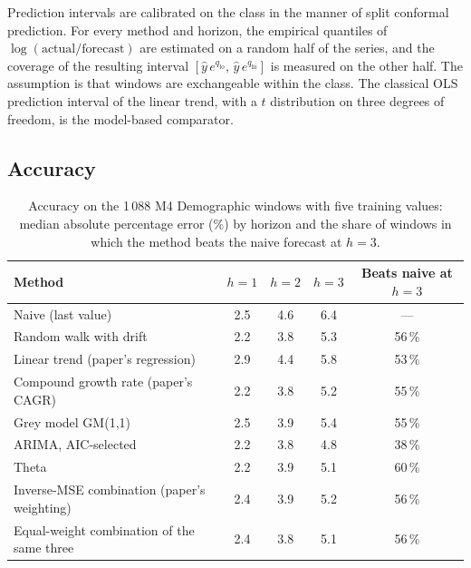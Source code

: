 Prediction intervals are calibrated on the class in the manner of split conformal prediction\cite{lei2018}. For every method and horizon, the empirical quantiles of $\log(\text{actual}/\text{forecast})$ are estimated on a random half of the series, and the coverage of the resulting interval $[\hat y\,e^{q_{\text{lo}}},\,\hat y\,e^{q_{\text{hi}}}]$ is measured on the other half. The assumption is that windows are exchangeable within the class. The classical OLS prediction interval of the linear trend, with a $t$ distribution on three degrees of freedom, is the model-based comparator.

\subsection{Accuracy}

\begin{table}[htbp]\centering\small
\caption{Accuracy on the 1\,088 M4 Demographic windows with five training values: median absolute percentage error (\%) by horizon and the share of windows in which the method beats the naive forecast at $h=3$.}\label{tab:pet-e2}
\begin{tabular}{lcccc}\toprule
Method & $h=1$ & $h=2$ & $h=3$ & Beats naive at $h=3$\\\midrule
Naive (last value) & 2.5 & 4.6 & 6.4 & ---\\
Random walk with drift & 2.2 & 3.8 & 5.3 & 56\,\%\\
Linear trend (paper's regression) & 2.9 & 4.4 & 5.8 & 53\,\%\\
Compound growth rate (paper's CAGR) & 2.2 & 3.8 & 5.2 & 55\,\%\\
Grey model GM(1,1) & 2.5 & 3.9 & 5.4 & 55\,\%\\
ARIMA, AIC-selected & 2.2 & 3.8 & 4.8 & 38\,\%\\
Theta & 2.2 & 3.9 & 5.1 & 60\,\%\\
Inverse-MSE combination (paper's weighting) & 2.4 & 3.9 & 5.2 & 56\,\%\\
Equal-weight combination of the same three & 2.4 & 3.8 & 5.1 & 56\,\%\\\bottomrule
\end{tabular}
\end{table}

